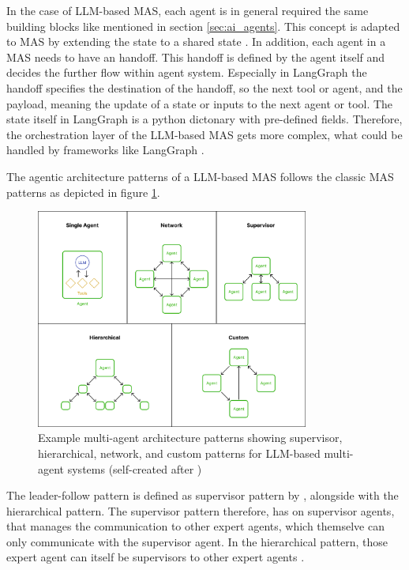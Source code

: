 \documentclass[a4paper,oneside,bibliography=totoc]{scrbook}
\begin{document}
In the case of \ac{LLM}-based \ac{MAS}, each agent is in general required the same building blocks like mentioned in section \ref{sec:ai_agents}. This concept is adapted to \ac{MAS} by extending the state to a shared state \cite{Sapkota2025}. In addition, each agent in a \ac{MAS} needs to have an handoff. This handoff is defined by the agent itself and decides the further flow within agent system. Especially in LangGraph the handoff specifies the destination of the handoff, so the next tool or agent, and the payload, meaning the update of a state or inputs to the next agent or tool. The state itself in LangGraph is a python dictonary with pre-defined fields. Therefore, the orchestration layer of the \ac{LLM}-based \ac{MAS} gets more complex, what could be handled by frameworks like LangGraph \cite{LangChain2025b}.

The agentic architecture patterns of a \ac{LLM}-based \ac{MAS} follows the classic \ac{MAS} patterns as depicted in figure \ref{fig:mas_architecture}.

\begin{figure}[t]
  \centering
  \includegraphics[width=0.8\textwidth]{figures/Multi-agent architectures.png}
  \caption{Example multi-agent architecture patterns showing supervisor, hierarchical, network, and custom patterns for LLM-based multi-agent systems (self-created after \cite{LangChain2025b})}
  \label{fig:mas_architecture}
\end{figure}

The leader-follow pattern is defined as supervisor pattern by \citet{LangChain2025b}, alongside with the hierarchical pattern. The supervisor pattern therefore, has on supervisor agents, that manages the communication to other expert agents, which themselve can only communicate with the supervisor agent. In the hierarchical pattern, those expert agent can itself be supervisors to other expert agents \cite{LangChain2025b}.
\end{document}
